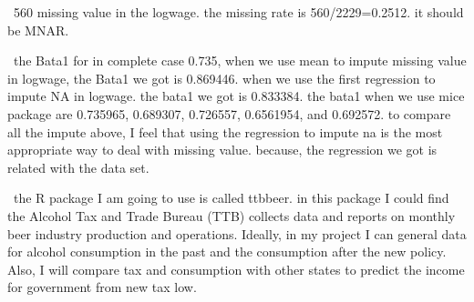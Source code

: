 \documentclass{article}
\begin{document}
\
560 missing value in the logwage. the missing rate is 560/2229=0.2512. it should be MNAR.

\
the Bata1 for in complete case 0.735, when we use mean to impute missing value in logwage, the Bata1 we got is 0.869446. when we use the first regression to impute NA in logwage. the bata1 we got is 0.833384. the bata1 when we use mice package are 0.735965, 0.689307, 0.726557, 0.6561954, and 0.692572. to compare all the impute above, I feel that using the regression to impute na is the most appropriate way to deal with missing value. because, the regression we got is related with the data set. 

\
the R package I am going to use is called ttbbeer. in this package I could find the Alcohol Tax and Trade Bureau (TTB) collects data and reports on monthly beer industry production and operations. Ideally, in my project I can general data for alcohol consumption in the past and the consumption after the new policy. Also, I will compare tax and consumption with other states to predict the income for government from new tax low.
\end{document}
